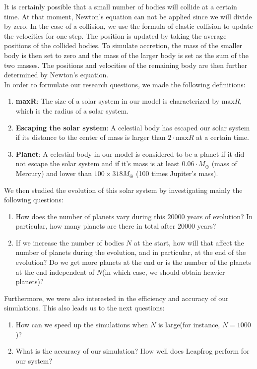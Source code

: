 It is certainly possible that a small number of bodies will collide at a certain time. 
At that moment, Newton's equation can not be applied since we will divide by zero. 
In the case of a collision, we use the formula of elastic collision to update the velocities for one step. The position is updated by taking the average positions of the collided bodies. 
To simulate accretion, the mass of the smaller body is then set to zero and the mass of the larger body is set as the sum of the two masses. 
The positions and velocities of the remaining body are then further determined by Newton's equation.\\

In order to formulate our research questions, we made the following definitions:\\
\begin{enumerate}
\item \textbf{maxR}: The size of a solar system in our model is characterized by $\text{max}R$, which is the radius of a solar system. 
\item \textbf{Escaping the solar system}: A celestial body has escaped our solar system if its distance to the center of mass is larger than $2\cdot\text{max}R$ at a certain time.
\item \textbf{Planet}: A celestial body in our model is considered to be a planet if it did not escape the solar system and if it's mass is at least $0.06\cdot M_{\oplus}$ (mass of Mercury) and lower than $100\times 318M_{\oplus}$ (100 times Jupiter's mass).
\end{enumerate}
We then studied the evolution of this solar system by investigating mainly the following questions:
\begin{enumerate}
	\item  How does the number of planets vary during this $20000$ years of evolution? In particular, how many planets are there in total after $20000$ years?
	
	\item  If we increase the number of bodies $N$ at the start, how will that affect the number of planets during the evolution, and in particular, at the end of the evolution? Do we get more planets at the end or is the number of the planets at the end independent of $N$(in which case, we should obtain heavier planets)?   
\end{enumerate}
Furthermore, we were also interested in the efficiency and accuracy of our simulations. This also leads us to the next questions:
\begin{enumerate}
	\item How can we speed up the simulations when $N$ is large(for instance, $N=1000$)?
	
	\item What is the accuracy of our simulation? How well does Leapfrog perform for our system?
\end{enumerate}

